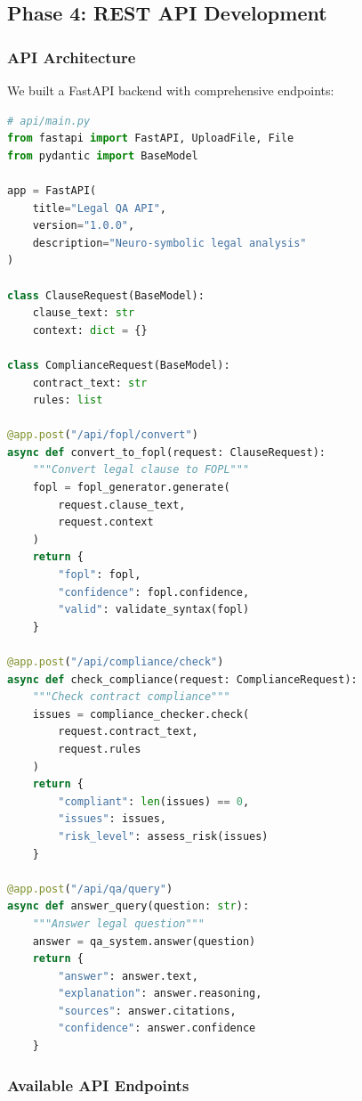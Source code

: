 \documentclass[12pt,a4paper]{article}
\begin{document}
\subsection{Phase 4: REST API Development}

\subsubsection{API Architecture}

We built a FastAPI backend with comprehensive endpoints:

\begin{lstlisting}[language=Python, caption=FastAPI Backend Structure]
# api/main.py
from fastapi import FastAPI, UploadFile, File
from pydantic import BaseModel

app = FastAPI(
    title="Legal QA API",
    version="1.0.0",
    description="Neuro-symbolic legal analysis"
)

class ClauseRequest(BaseModel):
    clause_text: str
    context: dict = {}

class ComplianceRequest(BaseModel):
    contract_text: str
    rules: list

@app.post("/api/fopl/convert")
async def convert_to_fopl(request: ClauseRequest):
    """Convert legal clause to FOPL"""
    fopl = fopl_generator.generate(
        request.clause_text,
        request.context
    )
    return {
        "fopl": fopl,
        "confidence": fopl.confidence,
        "valid": validate_syntax(fopl)
    }

@app.post("/api/compliance/check")
async def check_compliance(request: ComplianceRequest):
    """Check contract compliance"""
    issues = compliance_checker.check(
        request.contract_text,
        request.rules
    )
    return {
        "compliant": len(issues) == 0,
        "issues": issues,
        "risk_level": assess_risk(issues)
    }

@app.post("/api/qa/query")
async def answer_query(question: str):
    """Answer legal question"""
    answer = qa_system.answer(question)
    return {
        "answer": answer.text,
        "explanation": answer.reasoning,
        "sources": answer.citations,
        "confidence": answer.confidence
    }
\end{lstlisting}

\subsubsection{Available API Endpoints}
\end{document}
